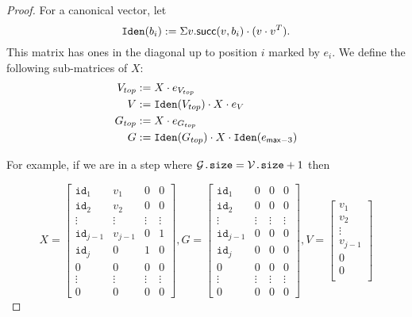 \begin{proof}
    For a canonical vector, let $$\texttt{Iden}(b_i):=\Sigma v. \mathsf{succ}(v,b_i)\cdot (v\cdot v^T).$$ This matrix has ones in the diagonal up to position $i$ marked by $e_{i}$. We define the following sub-matrices of $X$:
    \begin{align*}
        V_{top} &:= X\cdot e_{V_{top}} \\
        V &:= \texttt{Iden}(V_{top}) \cdot X \cdot e_V \\
        G_{top} &:=X\cdot e_{G_{top}} \\
        G &:= \texttt{Iden}(G_{top})\cdot X \cdot \texttt{Iden}(e_{\mathsf{max}-3})
    \end{align*}

    For example, if we are in a step where $\mathcal{G}\texttt{.size}=\mathcal{V}\texttt{.size} + 1$ then

    \[
    X = \begin{bmatrix}
        \texttt{id}_1 & v_1 & 0 & 0 \\
        \texttt{id}_2 & v_2 & 0 & 0 \\
        \vdots & \vdots & \vdots & \vdots \\
        \texttt{id}_{j-1} & v_{j-1} & 0 & 1 \\
        \texttt{id}_j & 0 & 1 & 0 \\
        0 & 0 & 0 & 0 \\
        \vdots & \vdots & \vdots & \vdots \\
        0 & 0 & 0 & 0
    \end{bmatrix}, 
    G = \begin{bmatrix}
        \texttt{id}_1 & 0 & 0 & 0 \\
        \texttt{id}_2 & 0 & 0 & 0\\
        \vdots & \vdots & \vdots & \vdots  \\
        \texttt{id}_{j-1} & 0 & 0 & 0\\
        \texttt{id}_j & 0 & 0 & 0\\
        0 & 0 & 0 & 0 \\
        \vdots & \vdots & \vdots & \vdots \\
        0 & 0 & 0 & 0
    \end{bmatrix}, 
    V = \begin{bmatrix}
        v_1  \\
        v_2 \\
        \vdots   \\
        v_{j-1} \\
        0 \\
        0 \\

\end{bmatrix}\]
\end{proof}

